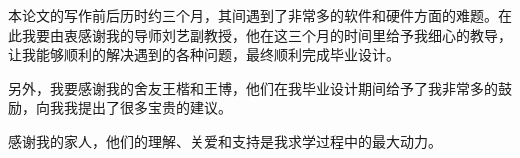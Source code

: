 
本论文的写作前后历时约三个月，其间遇到了非常多的软件和硬件方面的难题。在此我要由衷感谢我的导师刘艺副教授，他在这三个月的时间里给予我细心的教导，让我能够顺利的解决遇到的各种问题，最终顺利完成毕业设计。

另外，我要感谢我的舍友王楷和王博，他们在我毕业设计期间给予了我非常多的鼓励，向我我提出了很多宝贵的建议。

感谢我的家人，他们的理解、关爱和支持是我求学过程中的最大动力。



